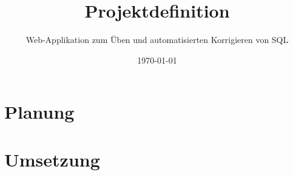 \documentclass[headlinesep,numbers=noenddot]{scrreprt}
\author{\authornames}
\title{Projektdefinition \projectname}
\subtitle{Web-Applikation zum Üben und automatisierten Korrigieren von SQL}
\date{\today}
\begin{document}
\maketitle

\tableofcontents



\cleardoublepage
\chapter{Planung}





\cleardoublepage
\chapter{Umsetzung}





\cleardoublepage
\appendix

\end{document}
